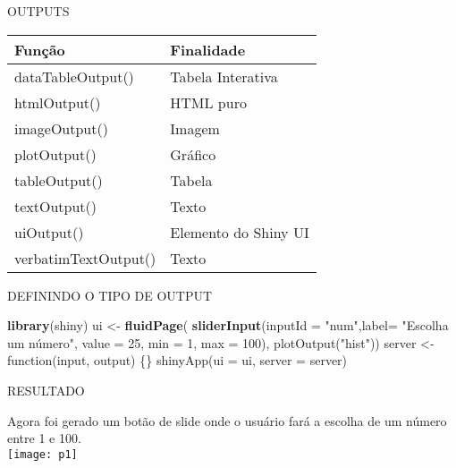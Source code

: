 \documentclass[
  ignorenonframetext,
]{beamer}
\newenvironment{Shaded}{\begin{snugshade}}{\end{snugshade}}
\newcommand{\DataTypeTok}[1]{\textcolor[rgb]{0.13,0.29,0.53}{#1}}
\newcommand{\KeywordTok}[1]{\textcolor[rgb]{0.13,0.29,0.53}{\textbf{#1}}}
\newcommand{\NormalTok}[1]{#1}
\newcommand{\StringTok}[1]{\textcolor[rgb]{0.31,0.60,0.02}{#1}}
\begin{document}
\begin{frame}{OUTPUTS}
\protect\hypertarget{outputs}{}

\begin{table}
\begin{tabular}{l | l}
Função & Finalidade \\
\hline \hline
dataTableOutput() &  Tabela Interativa \\
htmlOutput() & HTML puro \\ 
imageOutput() & Imagem \\
plotOutput() & Gráfico \\
tableOutput() & Tabela \\
textOutput() & Texto \\
uiOutput() & Elemento do Shiny UI \\
verbatimTextOutput() & Texto \\
\end{tabular}
\end{table}

\end{frame}

\begin{frame}[fragile]{DEFININDO O TIPO DE OUTPUT}
\protect\hypertarget{definindo-o-tipo-de-output}{}


\begin{Shaded}
\begin{Highlighting}[]
\KeywordTok{library}\NormalTok{(shiny)}
\NormalTok{ui <-}\StringTok{ }\KeywordTok{fluidPage}\NormalTok{(}
  \KeywordTok{sliderInput}\NormalTok{(}\DataTypeTok{inputId =} \StringTok{"num"}\NormalTok{,}\DataTypeTok{label=} \StringTok{"Escolha um número", value = 25, min = 1, max = 100), }
\StringTok{  plotOutput("}\NormalTok{hist}\StringTok{"))}
\StringTok{server <- function(input, output) \{\}}
\StringTok{shinyApp(ui = ui, server = server)}
\end{Highlighting}
\end{Shaded}

\end{frame}

\begin{frame}{RESULTADO}
\protect\hypertarget{resultado}{}

\begin{center}
      Agora foi gerado um \alert{botão de slide} onde o usuário fará a escolha de um número entre 1 e 100.\\\bigskip
    \texttt{[image: p1]}
\end{center}

\end{frame}
\end{document}

